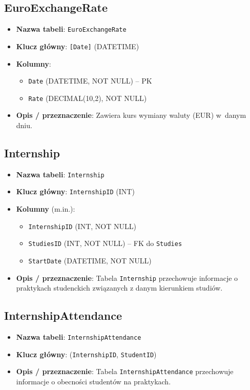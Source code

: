 \documentclass[12pt]{article}
\begin{document}
\subsection{EuroExchangeRate}
\begin{itemize}
    \item \textbf{Nazwa tabeli}: \texttt{EuroExchangeRate}
    \item \textbf{Klucz główny}: \texttt{[Date]} (DATETIME)
    \item \textbf{Kolumny}:
          \begin{itemize}
            \item \texttt{Date} (DATETIME, NOT NULL) -- PK
            \item \texttt{Rate} (DECIMAL(10,2), NOT NULL)
          \end{itemize}
    \item \textbf{Opis / przeznaczenie}:  
          Zawiera kurs wymiany waluty (EUR) w~danym dniu.
\end{itemize}

\subsection{Internship}
\begin{itemize}
    \item \textbf{Nazwa tabeli}: \texttt{Internship}
    \item \textbf{Klucz główny}: \texttt{InternshipID} (INT)
    \item \textbf{Kolumny} (m.in.):
          \begin{itemize}
            \item \texttt{InternshipID} (INT, NOT NULL)
            \item \texttt{StudiesID} (INT, NOT NULL) -- FK do \texttt{Studies}
            \item \texttt{StartDate} (DATETIME, NOT NULL)
          \end{itemize}
    \item \textbf{Opis / przeznaczenie}:  
        Tabela \texttt{Internship} przechowuje informacje o praktykach studenckich związanych z danym kierunkiem studiów.
\end{itemize}

\subsection{InternshipAttendance}
\begin{itemize}
    \item \textbf{Nazwa tabeli}: \texttt{InternshipAttendance}
    \item \textbf{Klucz główny}: (\texttt{InternshipID}, \texttt{StudentID})
    \item \textbf{Opis / przeznaczenie}:  
          Tabela \texttt{InternshipAttendance} przechowuje informacje o obecności studentów na praktykach.
\end{itemize}
\end{document}
